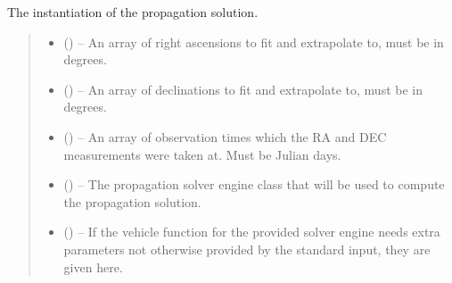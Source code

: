 \documentclass[letterpaper,11pt,english]{sphinxmanual}
\begin{document}
\begin{savenotes}
\begin{fulllineitems}
\begin{savenotes}\begin{fulllineitems}
\label{\detokenize{code/opihiexarata.propagate.solution:opihiexarata.propagate.solution.PropagativeSolution.__init__}}
\pysigstartsignatures
{}
\pysigstopsignatures
\sphinxAtStartPar
The instantiation of the propagation solution.
\begin{quote}\begin{description}
\begin{itemize}
\item {} 
\sphinxAtStartPar
{} () – An array of right ascensions to fit and extrapolate to, must be in
degrees.

\item {} 
\sphinxAtStartPar
{} () – An array of declinations to fit and extrapolate to, must be in
degrees.

\item {} 
\sphinxAtStartPar
{} () – An array of observation times which the RA and DEC measurements
were taken at. Must be Julian days.

\item {} 
\sphinxAtStartPar
{} ({\hyperref[\detokenize{code/opihiexarata.library.engine:opihiexarata.library.engine.PropagationEngine}]{}}) – The propagation solver engine class that will be used to compute
the propagation solution.

\item {} 
\sphinxAtStartPar
{} () – If the vehicle function for the provided solver engine needs
extra parameters not otherwise provided by the standard input,
they are given here.


\end{itemize}
\end{description}
\end{quote}
\end{fulllineitems}
\end{savenotes}
\end{fulllineitems}
\end{savenotes}
\end{document}
